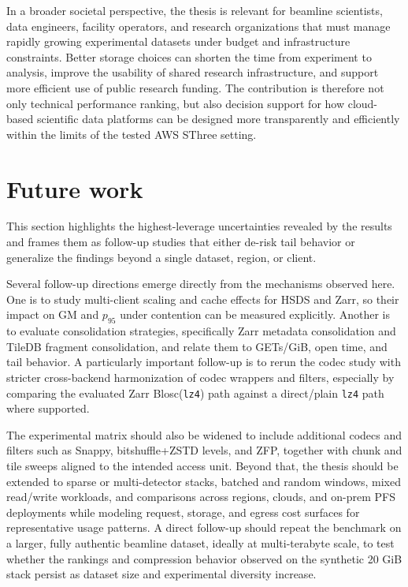 \documentclass[nomenclature, english, bibtex]{kththesis}
\numberwithin{listing}{chapter}
\begin{document}
In a broader societal perspective, the thesis is relevant for beamline scientists, data engineers, facility operators, and research organizations that must manage rapidly growing experimental datasets under budget and infrastructure constraints. Better storage choices can shorten the time from experiment to analysis, improve the usability of shared research infrastructure, and support more efficient use of public research funding. The contribution is therefore not only technical performance ranking, but also decision support for how cloud-based scientific data platforms can be designed more transparently and efficiently within the limits of the tested \gls{AWS} \gls{SThree} setting.


\section{Future work}
This section highlights the highest-leverage uncertainties revealed by the results and frames them as follow-up studies that either de-risk tail behavior or generalize the findings beyond a single dataset, region, or client.

Several follow-up directions emerge directly from the mechanisms observed here. One is to study multi-client scaling and cache effects for \gls{HSDS} and Zarr, so their impact on \gls{GM} and $p_{95}$ under contention can be measured explicitly. Another is to evaluate consolidation strategies, specifically Zarr metadata consolidation and TileDB fragment consolidation, and relate them to GETs/GiB, open time, and tail behavior. A particularly important follow-up is to rerun the codec study with stricter cross-backend harmonization of codec wrappers and filters, especially by comparing the evaluated Zarr Blosc(\texttt{lz4}) path against a direct/plain \texttt{lz4} path where supported.

The experimental matrix should also be widened to include additional codecs and filters such as Snappy, bitshuffle{+}\gls{ZSTD} levels, and ZFP, together with chunk and tile sweeps aligned to the intended access unit. Beyond that, the thesis should be extended to sparse or multi-detector stacks, batched and random windows, mixed read/write workloads, and comparisons across regions, clouds, and on-prem \gls{PFS} deployments while modeling request, storage, and egress cost surfaces for representative usage patterns. A direct follow-up should repeat the benchmark on a larger, fully authentic beamline dataset, ideally at multi-terabyte scale, to test whether the rankings and compression behavior observed on the synthetic 20 GiB stack persist as dataset size and experimental diversity increase.
\end{document}
